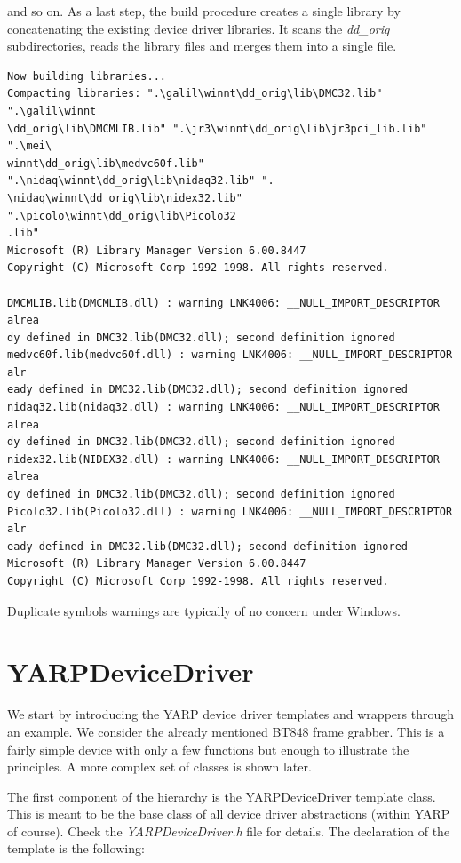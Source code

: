 \noindent and so on. As a last step, the build procedure creates a single library by concatenating the existing device driver libraries. It scans the {\em dd\_orig} subdirectories, reads the library files and merges them into a single file.

\begin{verbatim}
Now building libraries...
Compacting libraries: ".\galil\winnt\dd_orig\lib\DMC32.lib" ".\galil\winnt
\dd_orig\lib\DMCMLIB.lib" ".\jr3\winnt\dd_orig\lib\jr3pci_lib.lib" ".\mei\
winnt\dd_orig\lib\medvc60f.lib" ".\nidaq\winnt\dd_orig\lib\nidaq32.lib" ".
\nidaq\winnt\dd_orig\lib\nidex32.lib" ".\picolo\winnt\dd_orig\lib\Picolo32
.lib"
Microsoft (R) Library Manager Version 6.00.8447
Copyright (C) Microsoft Corp 1992-1998. All rights reserved.

DMCMLIB.lib(DMCMLIB.dll) : warning LNK4006: __NULL_IMPORT_DESCRIPTOR alrea
dy defined in DMC32.lib(DMC32.dll); second definition ignored
medvc60f.lib(medvc60f.dll) : warning LNK4006: __NULL_IMPORT_DESCRIPTOR alr
eady defined in DMC32.lib(DMC32.dll); second definition ignored
nidaq32.lib(nidaq32.dll) : warning LNK4006: __NULL_IMPORT_DESCRIPTOR alrea
dy defined in DMC32.lib(DMC32.dll); second definition ignored
nidex32.lib(NIDEX32.dll) : warning LNK4006: __NULL_IMPORT_DESCRIPTOR alrea
dy defined in DMC32.lib(DMC32.dll); second definition ignored
Picolo32.lib(Picolo32.dll) : warning LNK4006: __NULL_IMPORT_DESCRIPTOR alr
eady defined in DMC32.lib(DMC32.dll); second definition ignored
Microsoft (R) Library Manager Version 6.00.8447
Copyright (C) Microsoft Corp 1992-1998. All rights reserved.
\end{verbatim}

Duplicate symbols warnings are typically of no concern under Windows.



\section{YARPDeviceDriver}
We start by introducing the YARP device driver templates and wrappers through an example. We consider the already mentioned BT848 frame grabber. This is a fairly simple device with only a few functions but enough to illustrate the principles. A more complex set of classes is shown later.

The first component of the hierarchy is the YARPDeviceDriver template class. This is meant to be the base class of all device driver abstractions (within YARP of course). Check the {\em YARPDeviceDriver.h} file for details. The declaration of the template is the following:


